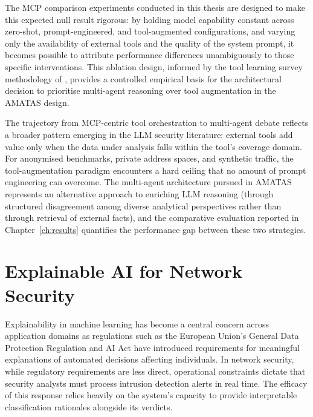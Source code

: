 \documentclass[../main.tex]{subfiles}
\begin{document}
The MCP comparison experiments conducted in this thesis are designed to make this expected null result rigorous: by holding model capability constant across zero-shot, prompt-engineered, and tool-augmented configurations, and varying only the availability of external tools and the quality of the system prompt, it becomes possible to attribute performance differences unambiguously to those specific interventions. This ablation design, informed by the tool learning survey methodology of \textcite{Qin2024}, provides a controlled empirical basis for the architectural decision to prioritise multi-agent reasoning over tool augmentation in the AMATAS design.

The trajectory from MCP-centric tool orchestration to multi-agent debate reflects a broader pattern emerging in the LLM security literature: external tools add value only when the data under analysis falls within the tool's coverage domain. For anonymised benchmarks, private address spaces, and synthetic traffic, the tool-augmentation paradigm encounters a hard ceiling that no amount of prompt engineering can overcome. The multi-agent architecture pursued in AMATAS represents an alternative approach to enriching LLM reasoning (through structured disagreement among diverse analytical perspectives rather than through retrieval of external facts), and the comparative evaluation reported in Chapter~\ref{ch:results} quantifies the performance gap between these two strategies.

\section{Explainable AI for Network Security}
\label{sec:explainable-ai}

Explainability in machine learning has become a central concern across application domains as regulations such as the European Union's General Data Protection Regulation and AI Act have introduced requirements for meaningful explanations of automated decisions affecting individuals. In network security, while regulatory requirements are less direct, operational constraints dictate that security analysts must process intrusion detection alerts in real time. The efficacy of this response relies heavily on the system's capacity to provide interpretable classification rationales alongside its verdicts.
\end{document}
